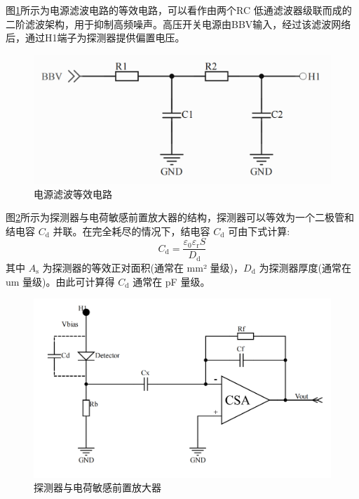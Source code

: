 \documentclass[twocolumn]{ctexart}
\begin{document}
图\ref{fig:power_filter}所示为电源滤波电路的等效电路，可以看作由两个RC 低通滤波器级联而成的二阶滤波架构，用于抑制高频噪声\cite{8}。高压开关电源由BBV输入，经过该滤波网络后，通过H1端子为探测器提供偏置电压。

\begin{figure}[htbp]
    \centering
    \includegraphics[width=\linewidth]{./power_filter.png}
    \caption{电源滤波等效电路}
    \label{fig:power_filter}
\end{figure}

图\ref{fig:detector_csa}所示为探测器与电荷敏感前置放大器的结构，探测器可以等效为一个二极管和结电容 $C_{\mathrm{d}}$ 并联。在完全耗尽的情况下，结电容 $C_{\mathrm{d}}$ 可由下式计算\cite{9}:
\begin{equation}
C_{\mathrm{d}} = \frac{\varepsilon_0 \varepsilon_{\mathrm{r}} S}{D_{\mathrm{d}}}
\end{equation}
其中 $A_{\mathrm{s}}$ 为探测器的等效正对面积(通常在 mm² 量级)，$D_{\mathrm{d}}$ 为探测器厚度(通常在 um 量级)。由此可计算得 $C_{\mathrm{d}}$ 通常在 pF 量级。

\begin{figure}[htbp]
    \centering
    \includegraphics[width=\linewidth]{./detector.png}
    \caption{探测器与电荷敏感前置放大器}
    \label{fig:detector_csa}
\end{figure}
\end{document}
